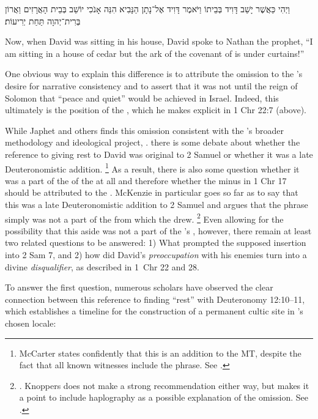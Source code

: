 \begin{hebrewtext}
    וַיְהִי כַּאֲשֶׁר יָשַׁב דָּוִיד בְּבֵיתוֹ וַיֹּאמֶר דָּוִיד אֶל־נָתָן הַנָּבִיא הִנֵּה אָנֹכִי יוֹשֵׁב בְּבֵית הָאֲרָזִים וַאֲרוֹן בְּרִית־יְהוָה תַּחַת יְרִיעוֹת׃
\end{hebrewtext}
\begin{translation}
    Now, when David was sitting in his house, David spoke to Nathan the prophet, ``I am sitting in a house of cedar but the ark of the covenant of \yahweh is under curtains!'' 
\end{translation}
One obvious way to explain this difference is to attribute the omission to the \chronicler's desire for narrative consistency and to assert that it was not until the reign of Solomon that ``peace and quiet'' would be achieved in Israel. Indeed, this ultimately is the position of the \chronicler, which he makes explicit in 1 Chr 22:7 (above). 

While Japhet and others finds this omission consistent with the \chronicler's broader methodology and ideological project,%
    \autocite[328]{japhet1993}.
there is some debate about whether the reference to \yahweh giving rest to David was original to 2 Samuel or whether it was a late Deuteronomistic addition.%
    \footnote{McCarter states confidently that this is an addition to the MT, despite the fact that all known witnesses include the phrase. See \cite[191]{mccarter1984}.}
As a result, there is also some question whether it was a part of the \vorlage of the \chronicler at all and therefore whether the minus in 1 Chr 17 should be attributed to the \chronicler. McKenzie in particular goes so far as to say that this was a late Deuteronomistic addition to 2 Samuel and argues that the phrase simply was not a part of the \vorlage from which the \chronicler drew.%
    \footnote{\cite[63]{mckenzie1985}. Knoppers does not make a strong recommendation either way, but makes it a point to include haplography as a possible explanation of the omission. See \cite[666]{knoppers2007}.}
Even allowing for the possibility that this aside was not a part of the \chronicler's \vorlage, however, there remain at least two related questions to be answered: 1) What prompted the supposed insertion into 2 Sam 7, and 2) how did David's \emph{preoccupation} with his enemies turn into a divine \emph{disqualifier}, as described in 1~Chr 22 and 28.

To answer the first question, numerous scholars have observed the clear connection between this reference to finding ``rest'' with Deuteronomy 12:10--11, which establishes a timeline for the construction of a permanent cultic site in \yahweh's chosen locale:

